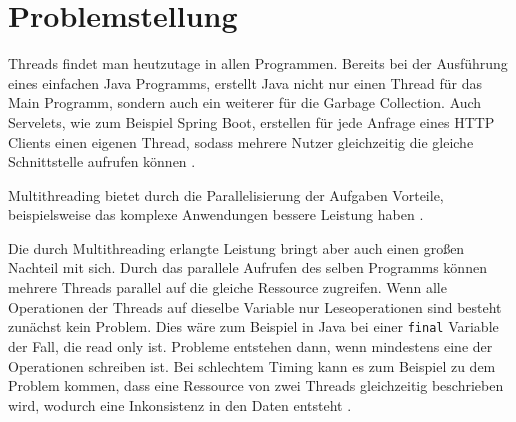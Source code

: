 \section{Problemstellung}

Threads findet man heutzutage in allen Programmen. Bereits bei der Ausführung eines einfachen Java Programms, erstellt Java nicht nur einen Thread für das Main Programm, sondern auch ein weiterer für die Garbage Collection. Auch Servelets, wie zum Beispiel Spring Boot, erstellen für jede Anfrage eines HTTP Clients einen eigenen Thread, sodass mehrere Nutzer gleichzeitig die gleiche Schnittstelle aufrufen können \cite[vgl.][8]{brian}.

Multithreading bietet durch die Parallelisierung der Aufgaben Vorteile, beispielsweise das komplexe Anwendungen bessere Leistung haben \cite[vgl.][3]{brian}. 

Die durch Multithreading erlangte Leistung bringt aber auch einen großen Nachteil mit sich. Durch das parallele Aufrufen des selben Programms können mehrere Threads parallel auf die gleiche Ressource zugreifen. Wenn alle Operationen der Threads auf dieselbe Variable nur Leseoperationen sind besteht zunächst kein Problem. Dies wäre zum Beispiel in Java  bei einer \texttt{final} Variable der Fall, die read only ist. Probleme entstehen dann, wenn mindestens eine der Operationen schreiben ist. Bei schlechtem Timing kann es zum Beispiel zu dem Problem kommen, dass eine Ressource von zwei Threads gleichzeitig beschrieben wird, wodurch eine Inkonsistenz in den Daten entsteht \cite[vgl.][11-15]{brian}.      